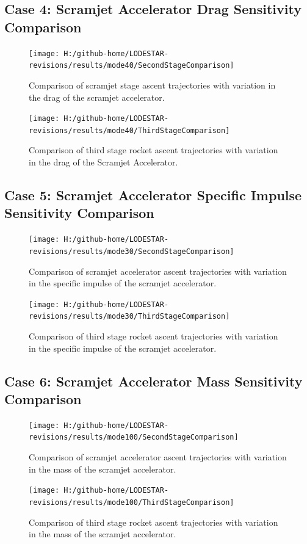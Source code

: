 \subsection{Case 4: Scramjet Accelerator Drag Sensitivity Comparison}\label{sec:app_comparison40}
\begin{figure}[!th]
\centering
\texttt{[image: H:/github-home/LODESTAR-revisions/results/mode40/SecondStageComparison]}
\caption{Comparison of scramjet stage ascent trajectories with variation in the drag of the scramjet accelerator.}
\label{fig:SecondStageComparison3}
\end{figure}
\begin{figure}[!th]
\centering
\texttt{[image: H:/github-home/LODESTAR-revisions/results/mode40/ThirdStageComparison]}
\caption{Comparison of third stage rocket ascent trajectories with variation in the drag of the Scramjet Accelerator.}
\label{fig:ThirdStageComparison3}
\end{figure}
\FloatBarrier
\clearpage
\subsection{Case 5: Scramjet Accelerator Specific Impulse Sensitivity Comparison}\label{sec:app_comparison30}
\begin{figure}[!th]
	\centering
	\texttt{[image: H:/github-home/LODESTAR-revisions/results/mode30/SecondStageComparison]}
	\caption{Comparison of scramjet accelerator ascent trajectories with variation in the specific impulse of the scramjet accelerator.}
	\label{fig:SecondStageComparison2}
\end{figure}
\begin{figure}[!th]
	\centering
	\texttt{[image: H:/github-home/LODESTAR-revisions/results/mode30/ThirdStageComparison]}
	\caption{Comparison of third stage rocket ascent trajectories with variation in the specific impulse of the scramjet accelerator.}
	\label{fig:ThirdStageComparison2}
\end{figure}
\FloatBarrier
\clearpage
\subsection{Case 6: Scramjet Accelerator Mass Sensitivity Comparison}\label{sec:app_comparison100}
\begin{figure}[!th]
\centering
\texttt{[image: H:/github-home/LODESTAR-revisions/results/mode100/SecondStageComparison]}
\caption{Comparison of scramjet accelerator ascent trajectories with variation in the mass of the scramjet accelerator.}
\label{fig:SecondStageComparison4}
\end{figure}
\begin{figure}[!th]
\centering
\texttt{[image: H:/github-home/LODESTAR-revisions/results/mode100/ThirdStageComparison]}
\caption{Comparison of third stage rocket ascent trajectories with variation in the mass of the scramjet accelerator.}
\label{fig:ThirdStageComparison4}
\end{figure}
\FloatBarrier
\clearpage
